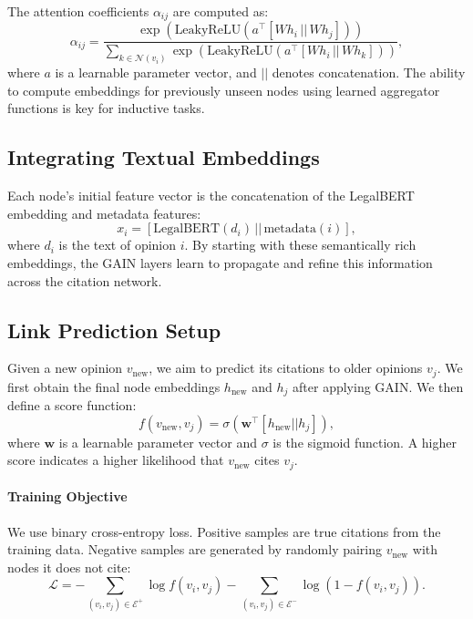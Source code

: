 \documentclass{article}
\begin{document}
The attention coefficients $\alpha_{ij}$ are computed as:
\begin{equation}
\alpha_{ij} = \frac{\exp\left(\text{LeakyReLU}(a^\top [W h_i \,||\, W h_j])\right)}{\sum_{k \in \mathcal{N}(v_i)} \exp\left(\text{LeakyReLU}(a^\top [W h_i \,||\, W h_k])\right)},
\end{equation}
where $a$ is a learnable parameter vector, and $||$ denotes concatenation. The ability to compute embeddings for previously unseen nodes using learned aggregator functions is key for inductive tasks.

\subsection{Integrating Textual Embeddings}
Each node’s initial feature vector is the concatenation of the LegalBERT embedding and metadata features:
\begin{equation}
x_i = [\text{LegalBERT}(d_i) \,||\, \text{metadata}(i)],
\end{equation}
where $d_i$ is the text of opinion $i$. By starting with these semantically rich embeddings, the GAIN layers learn to propagate and refine this information across the citation network.

\subsection{Link Prediction Setup}
Given a new opinion $v_{\text{new}}$, we aim to predict its citations to older opinions $v_j$. We first obtain the final node embeddings $h_{\text{new}}$ and $h_j$ after applying GAIN. We then define a score function:
\begin{equation}
f(v_{\text{new}}, v_j) = \sigma(\mathbf{w}^\top[h_{\text{new}} || h_j]),
\end{equation}
where $\mathbf{w}$ is a learnable parameter vector and $\sigma$ is the sigmoid function. A higher score indicates a higher likelihood that $v_{\text{new}}$ cites $v_j$.

\paragraph{Training Objective}
We use binary cross-entropy loss. Positive samples are true citations from the training data. Negative samples are generated by randomly pairing $v_{\text{new}}$ with nodes it does not cite:
\begin{equation}
\mathcal{L} = -\sum_{(v_i, v_j)\in\mathcal{E}^+}\log f(v_i,v_j) - \sum_{(v_i, v_j)\in\mathcal{E}^-}\log(1 - f(v_i,v_j)).
\end{equation}
\end{document}
